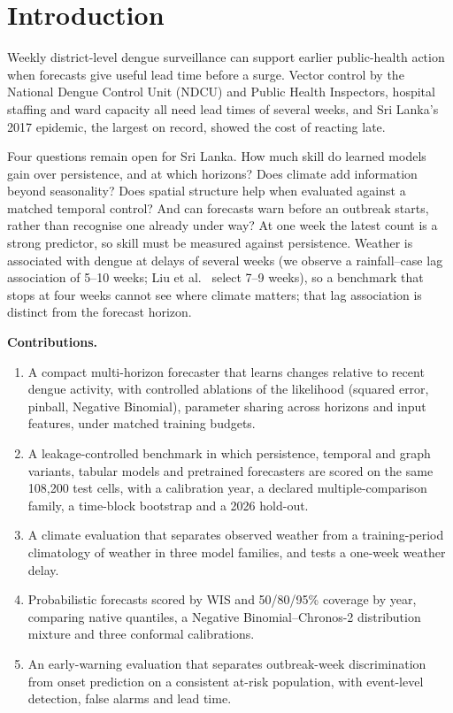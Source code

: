\maketitle

\section{Introduction}

Weekly district-level dengue surveillance can support earlier public-health action when forecasts give useful lead time before a surge. Vector control by the National Dengue Control Unit (NDCU) and Public Health Inspectors, hospital staffing and ward capacity all need lead times of several weeks, and Sri Lanka's 2017 epidemic, the largest on record, showed the cost of reacting late.

Four questions remain open for Sri Lanka. How much skill do learned models gain over persistence, and at which horizons? Does climate add information beyond seasonality? Does spatial structure help when evaluated against a matched temporal control? And can forecasts warn before an outbreak starts, rather than recognise one already under way? At one week the latest count is a strong predictor, so skill must be measured against persistence. Weather is associated with dengue at delays of several weeks (we observe a rainfall--case lag association of 5--10 weeks; Liu et al.~\cite{liu2025explainable} select 7--9 weeks), so a benchmark that stops at four weeks cannot see where climate matters; that lag association is distinct from the forecast horizon.

\textbf{Contributions.}
\begin{enumerate}
\item A compact multi-horizon forecaster that learns changes relative to recent dengue activity, with controlled ablations of the likelihood (squared error, pinball, Negative Binomial), parameter sharing across horizons and input features, under matched training budgets.
\item A leakage-controlled benchmark in which persistence, temporal and graph variants, tabular models and pretrained forecasters are scored on the same 108{,}200 test cells, with a calibration year, a declared multiple-comparison family, a time-block bootstrap and a 2026 hold-out.
\item A climate evaluation that separates observed weather from a training-period climatology of weather in three model families, and tests a one-week weather delay.
\item Probabilistic forecasts scored by WIS and 50/80/95\% coverage by year, comparing native quantiles, a Negative Binomial--Chronos-2 distribution mixture and three conformal calibrations.
\item An early-warning evaluation that separates outbreak-week discrimination from onset prediction on a consistent at-risk population, with event-level detection, false alarms and lead time.
\end{enumerate}

